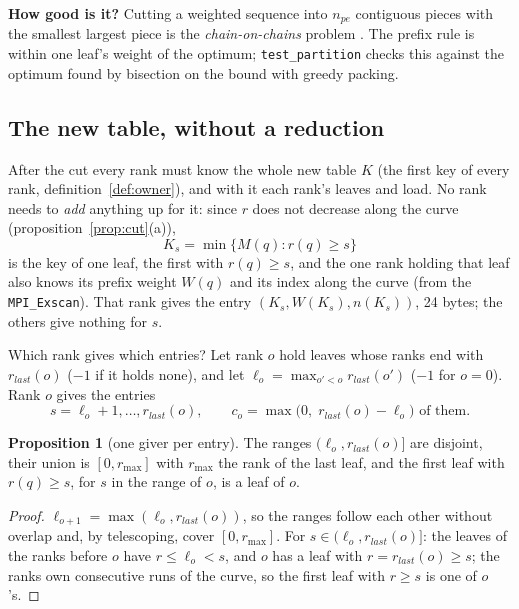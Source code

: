 \documentclass[10pt,a4paper]{article}
\theoremstyle{definition}
\newtheorem{proposition}{Proposition}
\newcommand{\fn}[1]{\texttt{#1}}
\begin{document}
\textbf{How good is it?} Cutting a weighted sequence into $n_{pe}$
contiguous pieces with the smallest largest piece is the
\emph{chain-on-chains} problem \cite{pinar}. The prefix rule is within one
leaf's weight of the optimum; \fn{test\_partition} checks this against
the optimum found by bisection on the bound with greedy packing.

\subsection{The new table, without a reduction}
\label{sec:table}

After the cut every rank must know the whole new table $K$ (the first key
of every rank, definition~\ref{def:owner}), and with it each rank's leaves
and load. No rank needs to \emph{add} anything up for it: since $r$ does
not decrease along the curve (proposition~\ref{prop:cut}(a)),
\[
  K_s = \min\{M(q) : r(q) \ge s\}
\]
is the key of one leaf, the first with $r(q) \ge s$, and the one rank
holding that leaf also knows its prefix weight $W(q)$ and its index along
the curve (from the \fn{MPI\_Exscan}). That rank gives the entry
$(K_s, W(K_s), n(K_s))$, 24 bytes; the others give nothing for $s$.

Which rank gives which entries? Let rank $o$ hold leaves whose ranks end
with $r_{last}(o)$ ($-1$ if it holds none), and let $\ell_o = \max_{o' <
o} r_{last}(o')$ ($-1$ for $o = 0$). Rank $o$ gives the entries
\[
  s = \ell_o + 1, \ldots, r_{last}(o), \qquad c_o = \max\big(0,\;
    r_{last}(o) - \ell_o\big) \text{ of them}.
\]

\begin{proposition}[one giver per entry]
  \label{prop:giver}
  The ranges $(\ell_o, r_{last}(o)]$ are disjoint, their union is
  $[0, r_{\max}]$ with $r_{\max}$ the rank of the last leaf, and the first
  leaf with $r(q) \ge s$, for $s$ in the range of $o$, is a leaf of $o$.
\end{proposition}

\begin{proof}
  $\ell_{o+1} = \max(\ell_o, r_{last}(o))$, so the ranges follow each
  other without overlap and, by telescoping, cover $[0, r_{\max}]$. For
  $s \in (\ell_o, r_{last}(o)]$: the leaves of the ranks before $o$ have
  $r \le \ell_o < s$, and $o$ has a leaf with $r = r_{last}(o) \ge s$;
  the ranks own consecutive runs of the curve, so the first leaf with $r
  \ge s$ is one of $o$'s.
\end{proof}
\end{document}
